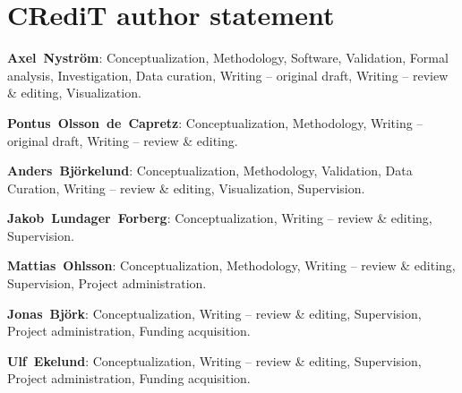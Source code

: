 \documentclass[a4paper,10pt]{article}
\begin{document}
\section*{CRediT author statement}
\mbox{\textbf{Axel~Nystr\"{o}m}}: Conceptualization, Methodology, Software, Validation, Formal analysis, Investigation, Data curation, Writing -- original draft, Writing -- review \& editing, Visualization.

\noindent
\mbox{\textbf{Pontus~Olsson~de~Capretz}}: Conceptualization, Methodology, Writing -- original draft, Writing -- review \& editing.

\noindent
\mbox{\textbf{Anders~Bj\"{o}rkelund}}: Conceptualization, Methodology, Validation, Data Curation, Writing -- review \& editing, Visualization, Supervision.

\noindent
\mbox{\textbf{Jakob~Lundager~Forberg}}: Conceptualization, Writing -- review \& editing, Supervision.

\noindent
\mbox{\textbf{Mattias~Ohlsson}}: Conceptualization, Methodology, Writing -- review \& editing, Supervision, Project administration.

\noindent
\mbox{\textbf{Jonas~Bj\"{o}rk}}: Conceptualization, Writing -- review \& editing, Supervision, Project administration, Funding acquisition.

\noindent
\mbox{\textbf{Ulf~Ekelund}}: Conceptualization, Writing -- review \& editing, Supervision, Project administration, Funding acquisition.
\end{document}
